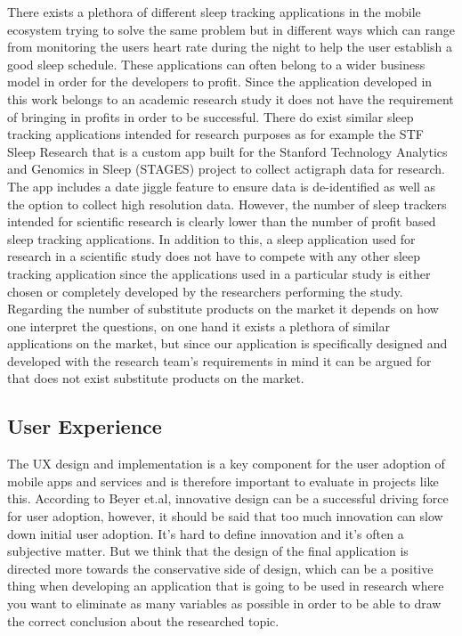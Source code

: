 \documentclass{article}
\begin{document}
There exists a plethora of different sleep tracking applications in the mobile ecosystem trying to solve the same problem but in different ways which can range from monitoring the users heart rate during the night to help the user establish a good sleep schedule. These applications can often belong to a wider business model in order for the developers to profit. Since the application developed in this work belongs to an academic research study it does not have the requirement of bringing in profits in order to be successful. There do exist similar sleep tracking applications intended for research purposes as for example the STF Sleep Research that is a custom app built for the Stanford Technology Analytics and Genomics in Sleep (STAGES) project to collect actigraph data for research. The app includes a date jiggle feature to ensure data is de-identified as well as the option to collect high resolution data. 
However, the number of sleep trackers intended for scientific research is clearly lower than the number of profit based sleep tracking applications. In addition to this, a sleep application used for research in a scientific study does not have to compete with any other sleep tracking application since the applications used in a particular study is either chosen or completely developed by the researchers performing the study. Regarding the number of substitute products on the market it depends on how one interpret the questions, on one hand it exists a plethora of similar applications on the market, but since our application is specifically designed and developed with the research team’s requirements in mind it can be argued for that does not exist substitute products on the market. 

\subsection{User Experience}

The UX design and implementation is a key component for the user adoption of mobile apps and services and is therefore important to evaluate in projects like this. According to Beyer et.al, innovative design can be a successful driving force for user adoption, however, it should be said that too much innovation can slow down initial user adoption.\cite{beyer_contextual_1998} It’s hard to define innovation and it’s often a subjective matter. But we think that the design of the final application is directed more towards the conservative side of design, which can be a positive thing when developing an application that is going to be used in research where you want to eliminate as many variables as possible in order to be able to draw the correct conclusion about the researched topic.\cite{galitz_essential_2007}
\end{document}

